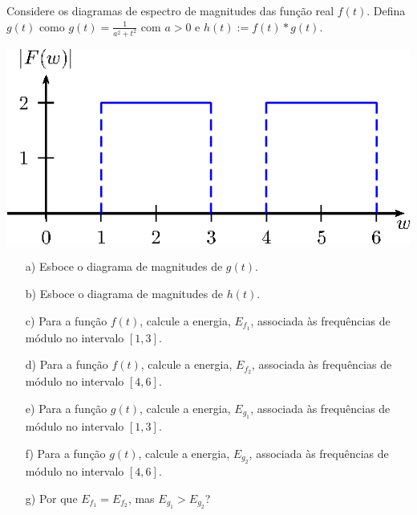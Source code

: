     
    \begin{exer} Considere os diagramas de espectro de magnitudes das função real $f(t)$. Defina $g(t)$ como $g(t)=\frac{1}{a^2+t^2}$ com $a>0$ e $h(t):= f(t)\ast g(t)$.
    
        \begin{center}
            \includegraphics{cap_propriedades_transformada/pics/diagrama_7C}
                \end{center}
        \begin{itemize}
            \item[a)] Esboce o diagrama de magnitudes de $g(t)$.
            \item[b)] Esboce o diagrama de magnitudes de $h(t)$.
            \item[c)] Para a função $f(t)$, calcule a energia, $E_{f_1}$, associada às frequências de módulo no intervalo $[1, 3]$.
            \item[d)] Para a função $f(t)$, calcule a energia, $E_{f_2}$, associada às frequências de módulo no intervalo $[4, 6]$.
            \item[e)] Para a função $g(t)$, calcule a energia, $E_{g_1}$, associada às frequências de módulo no intervalo $[1, 3]$.
            \item[f)] Para a função $g(t)$, calcule a energia, $E_{g_2}$, associada às frequências de módulo no intervalo $[4, 6]$.
            \item[g)] Por que $E_{f_1} = E_{f_2}$, mas $E_{g_1} > E_{g_2}$?
        \end{itemize}    
    \end{exer}
    

    
